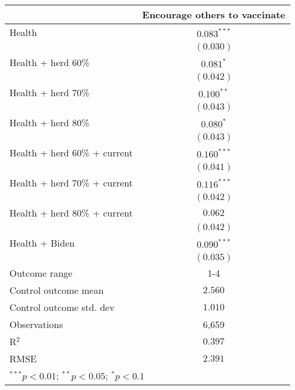 \begin{table}
\begin{center}
\begin{tabular}{l c}
\hline
 & Encourage others to vaccinate \\
\hline
Health                       & $0.083^{***}$ \\
                             & $(0.030)$     \\
Health + herd 60\%           & $0.081^{*}$   \\
                             & $(0.042)$     \\
Health + herd 70\%           & $0.100^{**}$  \\
                             & $(0.043)$     \\
Health + herd 80\%           & $0.080^{*}$   \\
                             & $(0.043)$     \\
Health + herd 60\% + current & $0.160^{***}$ \\
                             & $(0.041)$     \\
Health + herd 70\% + current & $0.116^{***}$ \\
                             & $(0.042)$     \\
Health + herd 80\% + current & $0.062$       \\
                             & $(0.042)$     \\
Health + Biden               & $0.090^{***}$ \\
                             & $(0.035)$     \\
\hline
Outcome range                & 1-4           \\
Control outcome mean         & $2.560$       \\
Control outcome std. dev     & $1.010$       \\
Observations                 & 6,659         \\
R$^{2}$                      & $0.397$       \\
RMSE                         & $2.391$       \\
\hline
\multicolumn{2}{l}{\scriptsize{$^{***}p<0.01$; $^{**}p<0.05$; $^{*}p<0.1$}}
\end{tabular}
\caption{}
\label{table:Tables and Figures/SI_table32_allinfo_pooled_encouragelin}
\end{center}
\end{table}
